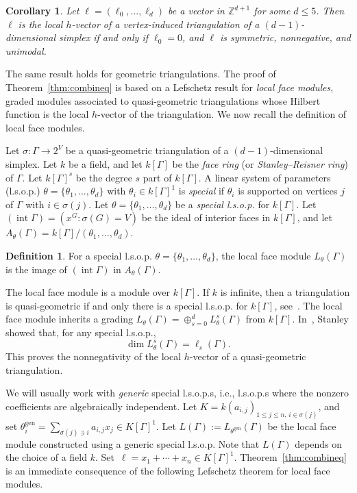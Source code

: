 \documentclass[11pt]{article}
\newtheorem{coro}[theo]{Corollary}
\theoremstyle{definition}
\newtheorem{defi}[theo]{Definition}
\numberwithin{equation}{section}
\numberwithin{equation}{section}
\begin{document}
\begin{coro}
Let $\ell = (\ell_0, \dotsc, \ell_d)$ be a vector in $\mathbb{Z}^{d+1}$ for some $d \le 5$. Then $\ell$ is the local $h$-vector of a vertex-induced triangulation of a $(d-1)$-dimensional simplex if and only if $\ell_0 = 0$, and $\ell$ is symmetric, nonnegative, and unimodal. 
\end{coro}

The same result holds for geometric triangulations. The proof of Theorem~\ref{thm:combineq} is based on a Lefschetz result for \emph{local face modules}, graded modules associated to quasi-geometric triangulations whose Hilbert function is the local $h$-vector of the triangulation. We now recall the definition of local face modules. 

Let $\sigma \colon \Gamma \to 2^V$ be a quasi-geometric triangulation of a $(d-1)$-dimensional simplex. 
Let $k$ be a field, and let $k[\Gamma]$ be the \emph{face ring} (or \emph{Stanley--Reisner ring}) of $\Gamma$. Let $k[\Gamma]^s$ be the degree $s$ part of $k[\Gamma]$. 
A linear system of parameters (l.s.o.p.) 
$ \theta = \{ \theta_1,\ldots,\theta_d \}$ with $\theta_i \in k[\Gamma]^1$
is \emph{special} if $\theta_i$ is supported on vertices $j$ of $\Gamma$ with $i \in \sigma(j)$. 
Let $\theta = \{ \theta_1,\ldots,\theta_d \}$ be a \emph{special l.s.o.p.} for $k[\Gamma]$.   Let $(\operatorname{int} \Gamma) = (x^G : \sigma(G) = V)$ be the ideal of interior faces in $k[\Gamma]$, and  let $A_{\theta}(\Gamma) = k[\Gamma]/(\theta_1, \dotsc, \theta_d)$.

\begin{defi}\label{def:localfacemodule}
For a special l.s.o.p. 
$\theta = \{ \theta_1,\ldots,\theta_d \}$,
the local face module $L_{\theta}(\Gamma)$ is the image of $(\operatorname{int} \Gamma)$ in
$A_{\theta}(\Gamma)$. 
\end{defi}

The local face module is a module over $k[\Gamma]$. If $k$ is infinite, then a triangulation is quasi-geometric if and only there is a special l.s.o.p. for $k[\Gamma]$, see~\cite[Corollary~4.4]{Stanleylocalh}. The local face module inherits a grading $L_{\theta}(\Gamma) = \oplus_{s = 0}^d  L^s_{\theta}(\Gamma)$ 
from $k[\Gamma]$. 
In~\cite[Theorem 4.6]{Stanleylocalh}, Stanley showed that, for any special l.s.o.p., 
$$\dim L^s_{\theta}(\Gamma) = \ell_s(\Gamma).$$
This proves the nonnegativity of the local $h$-vector of a quasi-geometric triangulation. 

We will usually work with \emph{generic} special l.s.o.p.s, i.e., l.s.o.p.s where the nonzero coefficients are algebraically independent. Let $K = k(a_{i,j})_{1 \le j \le n, \, i \in \sigma(j)}$, and set $\theta_i^{\operatorname{gen}} = \sum_{\sigma(j) \ni i} a_{i,j} x_j \in K[\Gamma]^1$. Let $L(\Gamma) := L_{\theta^{\operatorname{gen}}}(\Gamma)$ be the local face module constructed using a generic special l.s.o.p. Note that $L(\Gamma)$ depends on the choice of a field $k$. Set~$\ell = x_1 + \dotsb + x_n \in K[\Gamma]^1$. 
Theorem~\ref{thm:combineq} is an immediate consequence of the following Lefschetz theorem for local face modules. 
\end{document}
